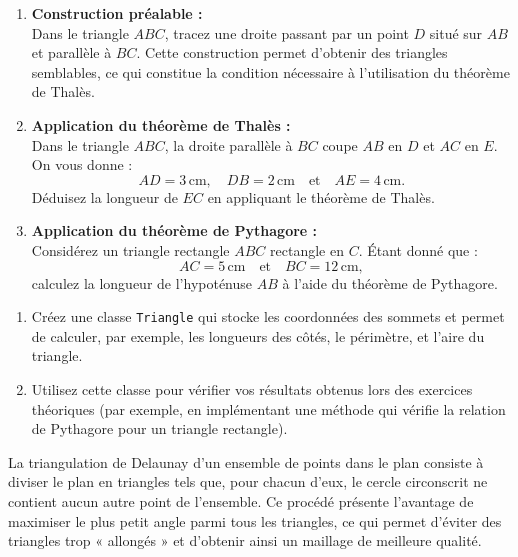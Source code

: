 \documentclass[a4paper,12pt]{article}
\theoremstyle{definition}
\begin{document}
\begin{enumerate}
  \item \textbf{Construction préalable :} \\
  Dans le triangle \(ABC\), tracez une droite passant par un point \(D\) situé sur \(AB\) et parallèle à \(BC\). Cette construction permet d’obtenir des triangles semblables, ce qui constitue la condition nécessaire à l’utilisation du théorème de Thalès.

  \item \textbf{Application du théorème de Thalès :} \\
  Dans le triangle \(ABC\), la droite parallèle à \(BC\) coupe \(AB\) en \(D\) et \(AC\) en \(E\). On vous donne :
  \[
  AD = 3\,\text{cm}, \quad DB = 2\,\text{cm} \quad \text{et} \quad AE = 4\,\text{cm}.
  \]
  Déduisez la longueur de \(EC\) en appliquant le théorème de Thalès.

  \item \textbf{Application du théorème de Pythagore :} \\
  Considérez un triangle rectangle \(ABC\) rectangle en \(C\). Étant donné que :
  \[
  AC = 5\,\text{cm} \quad \text{et} \quad BC = 12\,\text{cm},
  \]
  calculez la longueur de l’hypoténuse \(AB\) à l’aide du théorème de Pythagore.
\end{enumerate}


\begin{enumerate}
  \item Créez une classe \texttt{Triangle} qui stocke les coordonnées des sommets et permet de calculer, par exemple, les longueurs des côtés, le périmètre, et l’aire du triangle.
  \item Utilisez cette classe pour vérifier vos résultats obtenus lors des exercices théoriques (par exemple, en implémentant une méthode qui vérifie la relation de Pythagore pour un triangle rectangle).
\end{enumerate} 


La triangulation de Delaunay d'un ensemble de points dans le plan consiste à diviser le plan en triangles tels que, pour chacun d'eux, le cercle circonscrit ne contient aucun autre point de l'ensemble. Ce procédé présente l'avantage de maximiser le plus petit angle parmi tous les triangles, ce qui permet d'éviter des triangles trop « allongés » et d'obtenir ainsi un maillage de meilleure qualité.
\end{document}
